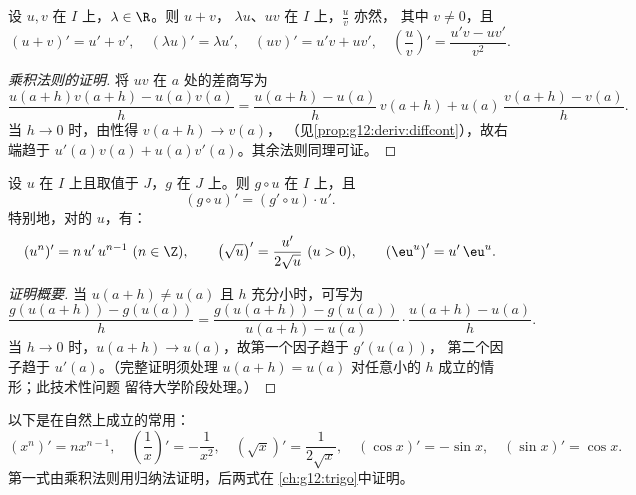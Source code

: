 \begin{proposition}[运算法则]\label{prop:g12:deriv:operations}
设 $u, v$ 在 $I$ 上，$\lambda \in \R$。则 $u + v$，
$\lambda u$、$uv$ 在 $I$ 上，$\frac{u}{v}$ 亦然，
其中 $v \neq 0$，且
\[
(u+v)' = u' + v', \quad (\lambda u)' = \lambda u', \quad
(uv)' = u'v + uv', \quad
\left(\frac{u}{v}\right)' = \frac{u'v - uv'}{v^2}.
\]
\end{proposition}

\begin{proof}[乘积法则的证明]
将 $uv$ 在 $a$ 处的差商写为
\[
\frac{u(a+h)v(a+h) - u(a)v(a)}{h}
= \frac{u(a+h) - u(a)}{h}\,v(a+h) + u(a)\,\frac{v(a+h) - v(a)}{h}.
\]
当 $h \to 0$ 时，由性得 $v(a+h) \to v(a)$，
（见\cref{prop:g12:deriv:diffcont}），故右端趋于
$u'(a)v(a) + u(a)v'(a)$。其余法则同理可证。
\end{proof}

\begin{theorem}[链式法则]\label{thm:g12:deriv:chain}
设 $u$ 在 $I$ 上且取值于 $J$，$g$ 在
$J$ 上。则 $g \circ u$ 在 $I$ 上，且
\[
(g \circ u)' = (g' \circ u) \cdot u' .
\]
特别地，对的 $u$，有：
\[
(u^n)' = n\,u'\,u^{n-1} \ (n \in \Z), \qquad
\left(\sqrt{u}\right)' = \frac{u'}{2\sqrt{u}} \ (u > 0), \qquad
\left(\eu^{u}\right)' = u'\,\eu^{u}.
\]
\end{theorem}

\begin{proof}[证明概要]
当 $u(a+h) \neq u(a)$ 且 $h$ 充分小时，可写为
\[
\frac{g(u(a+h)) - g(u(a))}{h}
= \frac{g(u(a+h)) - g(u(a))}{u(a+h) - u(a)} \cdot \frac{u(a+h) - u(a)}{h}.
\]
当 $h \to 0$ 时，$u(a+h) \to u(a)$，故第一个因子趋于 $g'(u(a))$，
第二个因子趋于 $u'(a)$。（完整证明须处理
$u(a+h) = u(a)$ 对任意小的 $h$ 成立的情形；此技术性问题
留待大学阶段处理。）
\end{proof}

\begin{example}
以下是在自然上成立的常用：
\[
(x^n)' = nx^{n-1}, \quad
\left(\frac{1}{x}\right)' = -\frac{1}{x^2}, \quad
(\sqrt{x})' = \frac{1}{2\sqrt{x}}, \quad
(\cos x)' = -\sin x, \quad
(\sin x)' = \cos x .
\]
第一式由乘积法则用归纳法证明，后两式在
\cref{ch:g12:trigo}中证明。
\end{example}

